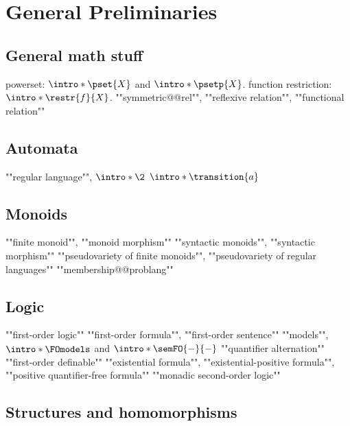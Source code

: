 \chapter{General Preliminaries}

\section{General math stuff}

\begin{itemize}
	\itemAP powerset: $\intro*\pset{X}$ and $\intro*\psetp{X}$.
	\itemAP function restriction: $\intro*\restr{f}{X}$.
	\itemAP ""symmetric@@rel"", ""reflexive relation"", ""functional relation""
\end{itemize}

\section{Automata}

\begin{itemize}
	\itemAP ""regular language"", $\intro*\2$
	\itemAP $\intro*\transition{a}$
\end{itemize}

\section{Monoids}

\begin{itemize}
	\itemAP ""finite monoid"", ""monoid morphism""
	\itemAP ""syntactic monoids"", ""syntactic morphism""
	\itemAP ""pseudovariety of finite monoids"", ""pseudovariety of regular languages""
	\itemAP ""membership@@problang""
\end{itemize}

\section{Logic}

\begin{itemize}
	\itemAP ""first-order logic""
	\itemAP ""first-order formula"", ""first-order sentence""
	\itemAP ""models"", $\intro*\FOmodels$ and $\intro*\semFO{-}{-}$
	\itemAP ""quantifier alternation""
	\itemAP ""first-order definable""
	\itemAP ""existential formula"", ""existential-positive formula"",
		""positive quantifier-free formula""
	\itemAP ""monadic second-order logic""
\end{itemize}

\section{Structures and homomorphisms}

